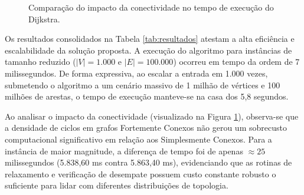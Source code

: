 \documentclass[12pt]{article}
\begin{document}
\begin{figure}[htbp]
    \centering
    \caption{Comparação do impacto da conectividade no tempo de execução do Dijkstra.}
    \label{fig:bar-chart}
\end{figure}

Os resultados consolidados na Tabela \ref{tab:resultados} atestam a alta eficiência e escalabilidade da solução proposta. A execução do algoritmo para instâncias de tamanho reduzido ($|V|=1.000$ e $|E|=100.000$) ocorreu em tempo da ordem de 7 milissegundos. De forma expressiva, ao escalar a entrada em 1.000 vezes, submetendo o algoritmo a um cenário massivo de 1 milhão de vértices e 100 milhões de arestas, o tempo de execução manteve-se na casa dos 5,8 segundos.

Ao analisar o impacto da conectividade (visualizado na Figura \ref{fig:bar-chart}), observa-se que a densidade de ciclos em grafos Fortemente Conexos não gerou um sobrecusto computacional significativo em relação aos Simplesmente Conexos. Para a instância de maior magnitude, a diferença de tempo foi de apenas $\approx 25$ milissegundos (5.838,60 ms contra 5.863,40 ms), evidenciando que as rotinas de relaxamento e verificação de desempate possuem custo constante robusto o suficiente para lidar com diferentes distribuições de topologia.
\end{document}
